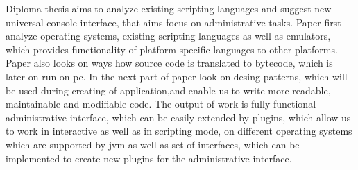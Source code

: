 Diploma thesis aims to analyze existing scripting languages and suggest new universal console interface, that aims focus on administrative tasks. Paper first analyze operating systems, existing scripting languages as well as emulators, which provides functionality of platform specific languages to other platforms. Paper also looks on ways how source code is translated to bytecode, which is later on run on \acrshort{pc}. In the next part of paper look on desing patterns, which will be used during creating of application,and  enable us to write more readable, maintainable and modifiable code. The output of work is fully functional administrative interface, which can be easily extended by plugins, which allow us to work in interactive as well as in scripting mode, on different operating systems which are supported by  \acrshort{jvm} as well as set of interfaces, which can be implemented to create new plugins for the administrative interface.


